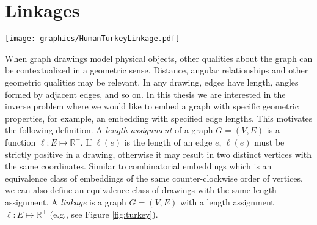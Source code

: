 \documentclass[10pt]{CSUNthesis}
\theoremstyle{plain}%
\theoremstyle{definition}
\theoremstyle{remark}
\newcommand{\bbr}{{\mathbb{R}}}
\begin{document}
\section{Linkages}

\begin{minipage}{\linewidth}
\begin{center}
\texttt{[image: graphics/HumanTurkeyLinkage.pdf]}
\label{fig:turkey}
\end{center}
\end{minipage}

When graph drawings model physical objects, other qualities about the graph can be contextualized in a geometric sense.  
Distance, angular relationships and other geometric qualities may be relevant.
In any drawing, edges have length, angles formed by adjacent edges, and so on.  
In this thesis we are interested in the inverse problem where we would like to embed a graph with specific geometric properties, for example, an embedding with specified edge lengths. 
This motivates the following definition.
A \textit{length assignment} of a graph $G=(V,E)$ is a function $\ell:E \mapsto \bbr^+$. 
If $\ell(e)$ is the length of an edge $e$, $\ell(e)$ must be strictly positive in a drawing, otherwise it may result in two distinct vertices with the same coordinates.
Similar to combinatorial embeddings which is an equivalence class of embeddings of the same counter-clockwise order of vertices, we can also define an equivalence class of drawings with the same length assignment.
A \textit{linkage} is a graph $G = (V,E)$ with a length assignment $\ell:E \mapsto \bbr^+$ (e.g., see Figure \ref{fig:turkey}).
\end{document}
